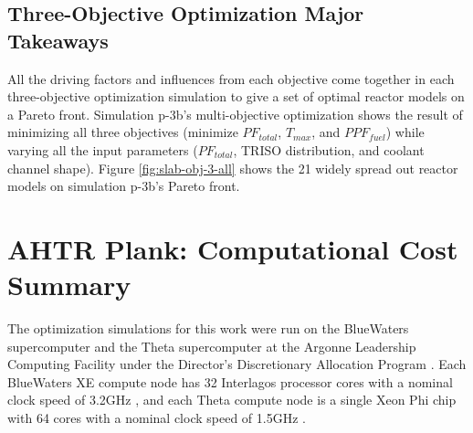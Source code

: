 \subsection{Three-Objective Optimization Major Takeaways}
All the driving factors and influences from each objective come together in 
each three-objective optimization simulation to give a set of optimal reactor models 
on a Pareto front. 
Simulation p-3b's multi-objective optimization shows the result of minimizing all 
three objectives (minimize $PF_{total}$, $T_{max}$, and $PPF_{fuel}$) while varying 
all the input parameters ($PF_{total}$, TRISO distribution, and coolant channel shape).
Figure \ref{fig:slab-obj-3-all} shows the 21 widely spread out reactor models on 
simulation p-3b's Pareto front. 

\section{AHTR Plank: Computational Cost Summary}
\label{sec:plank-compute-cost}
The optimization simulations for this work were run on the BlueWaters supercomputer 
\cite{ncsa_about_2017} and the Theta supercomputer at the Argonne Leadership Computing 
Facility under the Director's Discretionary Allocation Program 
\cite{noauthor_argonne_2022}. 
Each BlueWaters XE compute node has 32 Interlagos processor cores with a nominal 
clock speed of 3.2GHz \cite{ncsa_about_2017}, and each Theta compute node is a single 
Xeon Phi chip with 64 cores with a nominal clock speed of 1.5GHz 
\cite{noauthor_argonne_2022}.  

